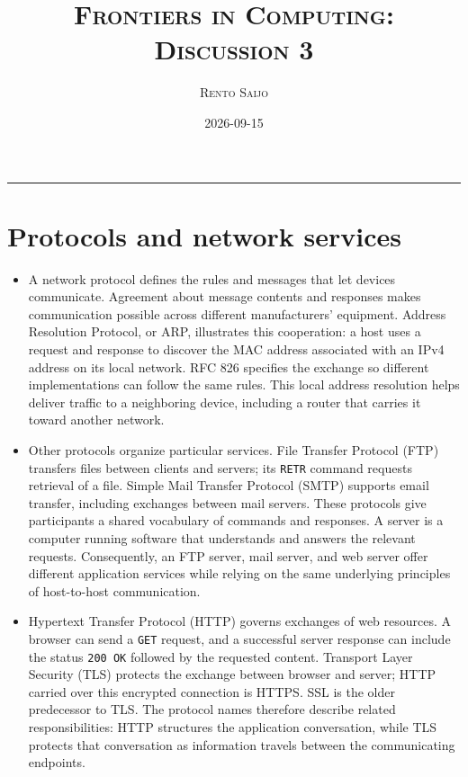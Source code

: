 \documentclass[10pt]{article}
\title{\Large\textsc{Frontiers in Computing: Discussion 3}}
\author{\large\textsc{Rento Saijo}}
\date{2026-09-15}
\begin{document}
\maketitle
\thispagestyle{fancy}
\vspace{-1em}\rule{\linewidth}{0.6pt}\vspace{0.5em}

\section*{Protocols and network services}

\begin{itemize}[leftmargin=1.25em, itemsep=0.3em, parsep=0pt, topsep=0pt]
    \item A network protocol defines the rules and messages that let devices communicate. Agreement about message contents and responses makes communication possible across different manufacturers' equipment. Address Resolution Protocol, or ARP, illustrates this cooperation: a host uses a request and response to discover the MAC address associated with an IPv4 address on its local network. RFC 826 specifies the exchange so different implementations can follow the same rules. This local address resolution helps deliver traffic to a neighboring device, including a router that carries it toward another network.

    \item Other protocols organize particular services. File Transfer Protocol (FTP) transfers files between clients and servers; its \texttt{RETR} command requests retrieval of a file. Simple Mail Transfer Protocol (SMTP) supports email transfer, including exchanges between mail servers. These protocols give participants a shared vocabulary of commands and responses. A server is a computer running software that understands and answers the relevant requests. Consequently, an FTP server, mail server, and web server offer different application services while relying on the same underlying principles of host-to-host communication.

    \item Hypertext Transfer Protocol (HTTP) governs exchanges of web resources. A browser can send a \texttt{GET} request, and a successful server response can include the status \texttt{200 OK} followed by the requested content. Transport Layer Security (TLS) protects the exchange between browser and server; HTTP carried over this encrypted connection is HTTPS. SSL is the older predecessor to TLS. The protocol names therefore describe related responsibilities: HTTP structures the application conversation, while TLS protects that conversation as information travels between the communicating endpoints.
\end{itemize}
\end{document}
